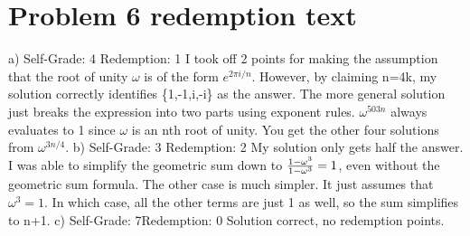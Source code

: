 \documentclass[11pt]{article}
\begin{document}
\newpage
\section*{Problem 6 redemption text}
a) Self-Grade: 4 \newline   Redemption: 1\newline
I took off 2 points for making the assumption that the root of unity $\omega$ is of the form $e^{2\pi i / n}$. However, by claiming n=4k, my solution correctly identifies  \{1,-1,i,-i\} as the answer. The more general solution just breaks the expression into two parts using exponent rules. $\omega ^ {503n}$ always evaluates to 1 since $\omega$ is an nth root of unity. You get the other four solutions from $\omega ^ {3n/4}$.\newline
b) Self-Grade: 3 \newline   Redemption: 2\newline
My solution only gets half the answer. I was able to simplify the geometric sum down to ${{1-\omega^3} \over {1-\omega^3}} = 1$, even without the geometric sum formula. The other case is much simpler. It just assumes that $\omega^3 = 1$. In which case, all the other terms are just 1 as well, so the sum simplifies to n+1.\newline
c) Self-Grade: 7\newline    Redemption: 0\newline
Solution correct, no redemption points.
\end{document}
